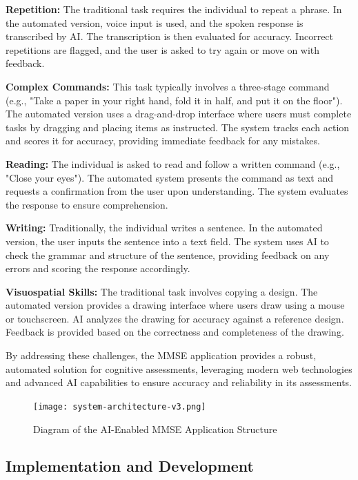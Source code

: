 \textbf{Repetition:} The traditional task requires the individual to repeat a phrase. In the automated version, voice input is used, and the spoken response is transcribed by AI. The transcription is then evaluated for accuracy. Incorrect repetitions are flagged, and the user is asked to try again or move on with feedback.

\textbf{Complex Commands:} This task typically involves a three-stage command (e.g., "Take a paper in your right hand, fold it in half, and put it on the floor"). The automated version uses a drag-and-drop interface where users must complete tasks by dragging and placing items as instructed. The system tracks each action and scores it for accuracy, providing immediate feedback for any mistakes.

\textbf{Reading:} The individual is asked to read and follow a written command (e.g., "Close your eyes"). The automated system presents the command as text and requests a confirmation from the user upon understanding. The system evaluates the response to ensure comprehension.

\textbf{Writing:} Traditionally, the individual writes a sentence. In the automated version, the user inputs the sentence into a text field. The system uses AI to check the grammar and structure of the sentence, providing feedback on any errors and scoring the response accordingly.

\textbf{Visuospatial Skills:} The traditional task involves copying a design. The automated version provides a drawing interface where users draw using a mouse or touchscreen. AI analyzes the drawing for accuracy against a reference design. Feedback is provided based on the correctness and completeness of the drawing.

By addressing these challenges, the MMSE application provides a robust, automated solution for cognitive assessments, leveraging modern web technologies and advanced AI capabilities to ensure accuracy and reliability in its assessments.

\begin{figure}[h!]
\begin{center}
\texttt{[image: system-architecture-v3.png]}
\caption{Diagram of the AI-Enabled MMSE Application Structure}
\label{fig:system-architecture}
\end{center}
\end{figure}

\subsection{Implementation and Development}

